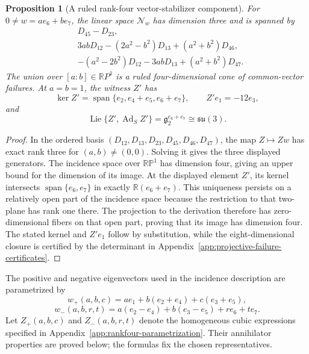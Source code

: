 \documentclass[11pt,a4paper]{article}
\newtheorem{proposition}[proposition]{Proposition}
\newcommand{\RR}{\mathbb R}
\newcommand{\gtwo}{\mathfrak g_2}
\newcommand{\Lie}{\operatorname{Lie}}
\newcommand{\Ad}{\operatorname{Ad}}
\newcommand{\Span}{\operatorname{span}}
\begin{document}
\begin{proposition}[A ruled rank-four vector-stabilizer component]
\label{prop:rankfour-failure}
For $0\ne w=ae_6+be_7$, the linear space $\mathcal N_w$ has dimension three and is spanned by
\begin{align*}
&D_{45}-D_{23},\\
&3abD_{12}-(2a^2-b^2)D_{13}+(a^2+b^2)D_{46},\\
&-(a^2-2b^2)D_{12}-3abD_{13}+(a^2+b^2)D_{47}.
\end{align*}
The union over $[a:b]\in\RR P^1$ is a ruled four-dimensional cone of common-vector failures.  At $a=b=1$, the witness $Z'$ has
\[
\ker Z'=\Span\{e_2,e_4+e_5,e_6+e_7\},
\qquad Z'e_1=-12e_3,
\]
and
\[
\Lie\{Z',\Ad_SZ'\}=\gtwo^{e_6+e_7}\cong\mathfrak{su}(3).
\]
\end{proposition}

\begin{proof}
In the ordered basis $(D_{12},D_{13},D_{23},D_{45},D_{46},D_{47})$, the map $Z\mapsto Zw$ has exact rank three for $(a,b)\ne(0,0)$.  Solving it gives the three displayed generators.  The incidence space over $\mathbb{RP}^1$ has dimension four, giving an upper bound for the dimension of its image.  At the displayed element $Z'$, its kernel intersects $\Span\{e_6,e_7\}$ in exactly $\RR(e_6+e_7)$.  This uniqueness persists on a relatively open part of the incidence space because the restriction to that two-plane has rank one there.  The projection to the derivation therefore has zero-dimensional fibers on that open part, proving that its image has dimension four.  The stated kernel and $Z'e_1$ follow by substitution, while the eight-dimensional closure is certified by the determinant in Appendix~\ref{app:projective-failure-certificates}.
\end{proof}

The positive and negative eigenvectors used in the incidence description are parametrized by
\[
w_+(a,b,c)=ae_1+b(e_2+e_4)+c(e_3+e_5),
\]
\[
w_-(a,b,r,t)=a(e_2-e_4)+b(e_3-e_5)+re_6+te_7.
\]
Let $Z_+(a,b,c)$ and $Z_-(a,b,r,t)$ denote the homogeneous cubic expressions
specified in Appendix~\ref{app:rankfour-parametrization}.
Their annihilator properties are proved below; the formulas fix the chosen representatives.
\end{document}
